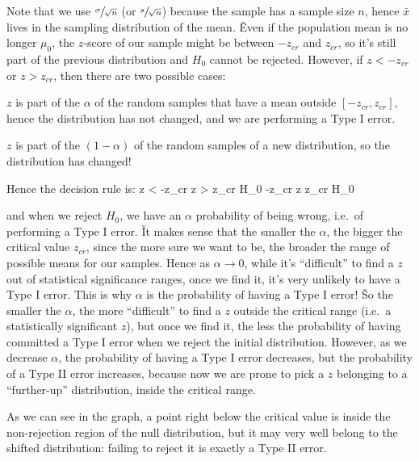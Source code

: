 Note that we use $\sfrac{\sigma}{\sqrt{n}}$ (or $\sfrac{s}{\sqrt{n}}$) because the sample has a sample size $n$,
hence $\bar{x}$ lives in the sampling distribution of the mean. \v

Even if the population mean is no longer $\mu_{0}$, the $z$-score of our sample might be between $-z_{cr}$ and
$z_{cr}$, so it's still part of the previous distribution and $H_{0}$ cannot be rejected. However, if
$z < -z_{cr}$ or $z > z_{cr}$, then there are two possible cases:

\bit
\item $z$ is part of the $\alpha$ of the random samples that have a mean outside $[-z_{cr}, z_{cr}]$, hence the
distribution has not changed, and we are performing a Type I error.
\item $z$ is part of the $(1 - \alpha)$ of the random samples of a new distribution, so the distribution has
changed!
\eit

Hence the decision rule is:
\bse
z < -z_{cr} \:\:  \:\: z > z_{cr} \imp {} H_{0} \qquad \qquad
-z_{cr} \leq z \leq z_{cr} \imp {} H_{0}
\ese

and when we reject $H_{0}$, we have an $\alpha$ probability of being wrong, i.e.\ of performing a Type I error. \v

It makes sense that the smaller the $\alpha$, the bigger the critical value $z_{cr}$, since the more sure we want
to be, the broader the range of possible means for our samples. Hence as $\alpha \to 0$, while it's ``difficult''
to find a $z$ out of statistical significance ranges, once we find it, it's very unlikely to have a Type I error.
This is why $\alpha$ is the probability of having a Type I error! \v

So the smaller the $\alpha$, the more ``difficult'' to find a $z$ outside the critical range (i.e.\ a statistically
significant $z$), but once we find it, the less the probability of having committed a Type I error when we reject
the initial distribution. However, as we decrease $\alpha$, the probability of having a Type I error decreases,
but the probability of a Type II error increases, because now we are prone to pick a $z$ belonging to a
``further-up'' distribution, inside the critical range.


As we can see in the graph, a point right below the critical value is inside the non-rejection region of the null
distribution, but it may very well belong to the shifted distribution: failing to reject it is exactly a Type II
error.

